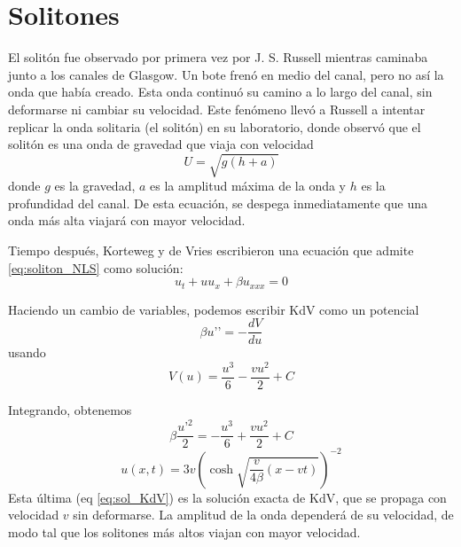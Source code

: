\documentclass[11pt]{article}
\begin{document}
    \section{Solitones}\label{sec:solitones}

    El solitón fue observado por primera vez por J. S. Russell mientras caminaba junto a los canales de Glasgow.
    Un bote frenó en medio del canal, pero no así la onda que había creado.
    Esta onda continuó su camino a lo largo del canal, sin deformarse ni cambiar su velocidad.
    Este fenómeno llevó a Russell a intentar replicar la onda solitaria (el solitón) en su laboratorio, donde observó que el solitón es una onda de gravedad que viaja con velocidad
    \begin{equation}
        U = \sqrt{g(h+a)}
        \label{eq:vel_soliton}
    \end{equation}
    donde $g$ es la gravedad, $a$ es la amplitud máxima de la onda y $h$ es la profundidad del canal.
    De esta ecuación, se despega inmediatamente que una onda más alta viajará con mayor velocidad.


    Tiempo después, Korteweg y de Vries escribieron una ecuación que admite \ref{eq:soliton_NLS} como solución:
    \begin{equation}
        u_t + u u_x + \beta u_{xxx} = 0
        \label{eq:KdV}
    \end{equation}

    Haciendo un cambio de variables, podemos escribir KdV como un potencial
    \begin{equation}
        \beta u’’ = -\frac{dV}{du}
        \label{eq:KdV_potencial}
    \end{equation}
    usando
    \begin{equation*}
        V(u) = \frac{u^3}{6}- \frac{vu^2}{2} + C
    \end{equation*}

    Integrando, obtenemos
    \begin{equation*}
        \beta \frac{u’^2}{2} = -\frac{u^3}{6} + \frac{vu^2}{2} + C
    \end{equation*}
    \begin{equation}
        u(x,t) = 3 v (\cosh{ \sqrt{ \frac{v}{4\beta} (x-vt) } })^{-2}
        \label{eq:sol_KdV}
    \end{equation}
    Esta última (eq \ref{eq:sol_KdV}) es la solución exacta de KdV, que se propaga con velocidad $v$ sin deformarse.
    La amplitud de la onda dependerá de su velocidad, de modo tal que los solitones más altos viajan con mayor velocidad.
\end{document}
